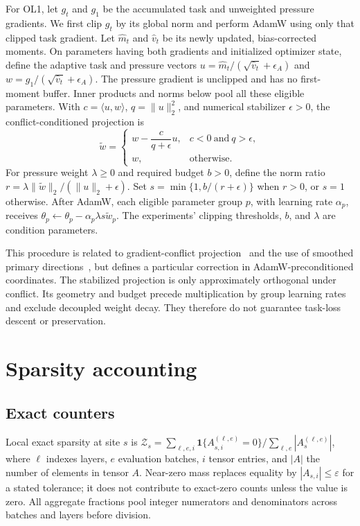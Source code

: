 For OL1, let $g_t$ and $g_1$ be the accumulated task and unweighted pressure
gradients. We first clip $g_t$ by its global norm and perform AdamW using only
that clipped task gradient. Let $\widehat m_t$ and $\widehat v_t$ be its newly
updated, bias-corrected moments. On parameters having both gradients and
initialized optimizer state, define the adaptive task and pressure vectors
$u=\widehat m_t/(\sqrt{\widehat v_t}+\epsilon_A)$ and
$w=g_1/(\sqrt{\widehat v_t}+\epsilon_A)$. The pressure gradient is unclipped
and has no first-moment buffer. Inner products and norms below pool all these
eligible parameters. With $c=\langle u,w\rangle$, $q=\|u\|_2^2$, and numerical
stabilizer $\epsilon>0$, the conflict-conditioned projection is
\begin{equation}
\widetilde w=
\begin{cases}
w-\dfrac{c}{q+\epsilon}u, & c<0\ \text{and}\ q>\epsilon,\\[3pt]
w, & \text{otherwise}.
\end{cases}
\label{eq:ol1-projection}
\end{equation}
For pressure weight $\lambda\geq0$ and required budget $b>0$, define the norm ratio
$r=\lambda\|\widetilde w\|_2/(\|u\|_2+\epsilon)$. Set
$s=\min\{1,b/(r+\epsilon)\}$ when $r>0$, or $s=1$ otherwise. After AdamW,
each eligible parameter group $p$, with learning rate $\alpha_p$, receives
$\theta_p\leftarrow\theta_p-\alpha_p\lambda s\widetilde w_p$.
The experiments' clipping thresholds, $b$, and $\lambda$ are condition
parameters.

This procedure is related to gradient-conflict projection~\citep{yu2020pcgrad}
and the use of smoothed primary directions~\citep{hsieh2024bloop}, but defines
a particular correction in AdamW-preconditioned coordinates. The stabilized
projection is only approximately orthogonal under conflict. Its geometry and
budget precede multiplication by group learning rates and exclude decoupled
weight decay. They therefore do not guarantee task-loss descent or preservation.

\section{Sparsity accounting}
\label{app:accounting}

\subsection{Exact counters}

Local exact sparsity at site $s$ is
$\mathcal{Z}_s=\sum_{\ell,e,i}\mathbf{1}\{A^{(\ell,e)}_{s,i}=0\}/
\sum_{\ell,e}|A_s^{(\ell,e)}|$, where $\ell$ indexes layers, $e$ evaluation
batches, $i$ tensor entries, and $|A|$ the number of elements in tensor $A$. Near-zero mass replaces equality by
$|A_{s,i}|\leq\varepsilon$ for a stated tolerance; it does not contribute to
exact-zero counts unless the value is zero. All aggregate fractions pool
integer numerators and denominators across batches and layers before division.

